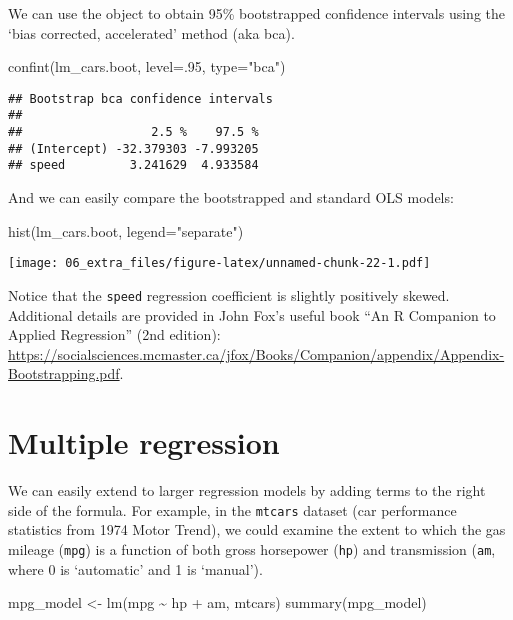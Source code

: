 \documentclass[
]{book}
\newenvironment{Shaded}{\begin{snugshade}}{\end{snugshade}}
\newcommand{\AttributeTok}[1]{\textcolor[rgb]{0.77,0.63,0.00}{#1}}
\newcommand{\DecValTok}[1]{\textcolor[rgb]{0.00,0.00,0.81}{#1}}
\newcommand{\FunctionTok}[1]{\textcolor[rgb]{0.00,0.00,0.00}{#1}}
\newcommand{\NormalTok}[1]{#1}
\newcommand{\OtherTok}[1]{\textcolor[rgb]{0.56,0.35,0.01}{#1}}
\newcommand{\SpecialCharTok}[1]{\textcolor[rgb]{0.00,0.00,0.00}{#1}}
\newcommand{\StringTok}[1]{\textcolor[rgb]{0.31,0.60,0.02}{#1}}
\begin{document}
We can use the object to obtain 95\% bootstrapped confidence intervals using the `bias corrected, accelerated' method (aka bca).

\begin{Shaded}
\begin{Highlighting}[]
\FunctionTok{confint}\NormalTok{(lm\_cars.boot, }\AttributeTok{level=}\NormalTok{.}\DecValTok{95}\NormalTok{, }\AttributeTok{type=}\StringTok{"bca"}\NormalTok{)}
\end{Highlighting}
\end{Shaded}

\begin{verbatim}
## Bootstrap bca confidence intervals
## 
##                  2.5 %    97.5 %
## (Intercept) -32.379303 -7.993205
## speed         3.241629  4.933584
\end{verbatim}

And we can easily compare the bootstrapped and standard OLS models:

\begin{Shaded}
\begin{Highlighting}[]
\FunctionTok{hist}\NormalTok{(lm\_cars.boot, }\AttributeTok{legend=}\StringTok{"separate"}\NormalTok{)}
\end{Highlighting}
\end{Shaded}

\texttt{[image: 06\_extra\_files/figure-latex/unnamed-chunk-22-1.pdf]}

Notice that the \texttt{speed} regression coefficient is slightly positively skewed. Additional details are provided in John Fox's useful book ``An R Companion to Applied Regression'' (2nd edition): \url{https://socialsciences.mcmaster.ca/jfox/Books/Companion/appendix/Appendix-Bootstrapping.pdf}.

\hypertarget{multiple-regression}{%
\section{Multiple regression}\label{multiple-regression}}

We can easily extend to larger regression models by adding terms to the right side of the formula. For example, in the \texttt{mtcars} dataset (car performance statistics from 1974 Motor Trend), we could examine the extent to which the gas mileage (\texttt{mpg}) is a function of both gross horsepower (\texttt{hp}) and transmission (\texttt{am}, where 0 is `automatic' and 1 is `manual').

\begin{Shaded}
\begin{Highlighting}[]
\NormalTok{mpg\_model }\OtherTok{\textless{}{-}} \FunctionTok{lm}\NormalTok{(mpg }\SpecialCharTok{\textasciitilde{}}\NormalTok{ hp }\SpecialCharTok{+}\NormalTok{ am, mtcars)}
\FunctionTok{summary}\NormalTok{(mpg\_model)}
\end{Highlighting}
\end{Shaded}
\end{document}
